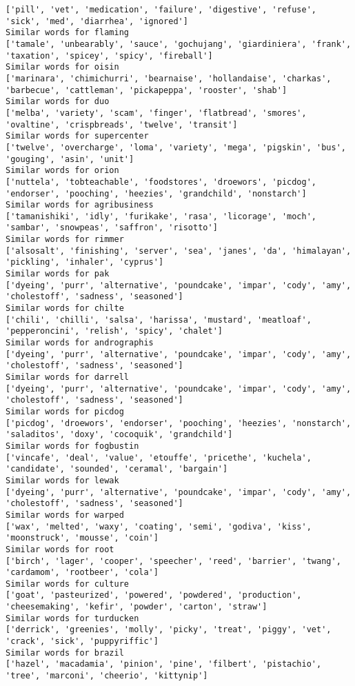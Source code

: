 \documentclass[11pt]{article}
\begin{document}
\begin{Verbatim}[commandchars=\\\{\}]
['pill', 'vet', 'medication', 'failure', 'digestive', 'refuse', 'sick', 'med', 'diarrhea', 'ignored']
Similar words for flaming
['tamale', 'unbearably', 'sauce', 'gochujang', 'giardiniera', 'frank', 'taxation', 'spicey', 'spicy', 'fireball']
Similar words for oisin
['marinara', 'chimichurri', 'bearnaise', 'hollandaise', 'charkas', 'barbecue', 'cattleman', 'pickapeppa', 'rooster', 'shab']
Similar words for duo
['melba', 'variety', 'scam', 'finger', 'flatbread', 'smores', 'ovaltine', 'crispbreads', 'twelve', 'transit']
Similar words for supercenter
['twelve', 'overcharge', 'loma', 'variety', 'mega', 'pigskin', 'bus', 'gouging', 'asin', 'unit']
Similar words for orion
['nuttela', 'tobteachable', 'foodstores', 'droewors', 'picdog', 'endorser', 'pooching', 'heezies', 'grandchild', 'nonstarch']
Similar words for agribusiness
['tamanishiki', 'idly', 'furikake', 'rasa', 'licorage', 'moch', 'sambar', 'snowpeas', 'saffron', 'risotto']
Similar words for rimmer
['alsosalt', 'finishing', 'server', 'sea', 'janes', 'da', 'himalayan', 'pickling', 'inhaler', 'cyprus']
Similar words for pak
['dyeing', 'purr', 'alternative', 'poundcake', 'impar', 'cody', 'amy', 'cholestoff', 'sadness', 'seasoned']
Similar words for chilte
['chili', 'chilli', 'salsa', 'harissa', 'mustard', 'meatloaf', 'pepperoncini', 'relish', 'spicy', 'chalet']
Similar words for andrographis
['dyeing', 'purr', 'alternative', 'poundcake', 'impar', 'cody', 'amy', 'cholestoff', 'sadness', 'seasoned']
Similar words for darrell
['dyeing', 'purr', 'alternative', 'poundcake', 'impar', 'cody', 'amy', 'cholestoff', 'sadness', 'seasoned']
Similar words for picdog
['picdog', 'droewors', 'endorser', 'pooching', 'heezies', 'nonstarch', 'saladitos', 'doxy', 'cocoquik', 'grandchild']
Similar words for fogbustin
['vincafe', 'deal', 'value', 'etouffe', 'pricethe', 'kuchela', 'candidate', 'sounded', 'ceramal', 'bargain']
Similar words for lewak
['dyeing', 'purr', 'alternative', 'poundcake', 'impar', 'cody', 'amy', 'cholestoff', 'sadness', 'seasoned']
Similar words for warped
['wax', 'melted', 'waxy', 'coating', 'semi', 'godiva', 'kiss', 'moonstruck', 'mousse', 'coin']
Similar words for root
['birch', 'lager', 'cooper', 'speecher', 'reed', 'barrier', 'twang', 'cardamom', 'rootbeer', 'cola']
Similar words for culture
['goat', 'pasteurized', 'powered', 'powdered', 'production', 'cheesemaking', 'kefir', 'powder', 'carton', 'straw']
Similar words for turducken
['derrick', 'greenies', 'molly', 'picky', 'treat', 'piggy', 'vet', 'crack', 'sick', 'puppyriffic']
Similar words for brazil
['hazel', 'macadamia', 'pinion', 'pine', 'filbert', 'pistachio', 'tree', 'marconi', 'cheerio', 'kittynip']

\end{Verbatim}
\end{document}
